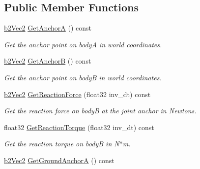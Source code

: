 \subsection*{Public Member Functions}
\begin{DoxyCompactItemize}
\item 
\hyperlink{structb2_vec2}{b2\+Vec2} \hyperlink{classb2_pulley_joint_a05ac0d0d927e9541f08b07cb1bf9ec56}{Get\+AnchorA} () const \hypertarget{classb2_pulley_joint_a05ac0d0d927e9541f08b07cb1bf9ec56}{}\label{classb2_pulley_joint_a05ac0d0d927e9541f08b07cb1bf9ec56}

\begin{DoxyCompactList}\small\item\em Get the anchor point on bodyA in world coordinates. \end{DoxyCompactList}\item 
\hyperlink{structb2_vec2}{b2\+Vec2} \hyperlink{classb2_pulley_joint_a5cc3596f683d621b9a885c2569ecd452}{Get\+AnchorB} () const \hypertarget{classb2_pulley_joint_a5cc3596f683d621b9a885c2569ecd452}{}\label{classb2_pulley_joint_a5cc3596f683d621b9a885c2569ecd452}

\begin{DoxyCompactList}\small\item\em Get the anchor point on bodyB in world coordinates. \end{DoxyCompactList}\item 
\hyperlink{structb2_vec2}{b2\+Vec2} \hyperlink{classb2_pulley_joint_a38c174bf1cf1011063ff4c16556b331e}{Get\+Reaction\+Force} (float32 inv\+\_\+dt) const \hypertarget{classb2_pulley_joint_a38c174bf1cf1011063ff4c16556b331e}{}\label{classb2_pulley_joint_a38c174bf1cf1011063ff4c16556b331e}

\begin{DoxyCompactList}\small\item\em Get the reaction force on bodyB at the joint anchor in Newtons. \end{DoxyCompactList}\item 
float32 \hyperlink{classb2_pulley_joint_a418b200055623474c44742b1342dd278}{Get\+Reaction\+Torque} (float32 inv\+\_\+dt) const \hypertarget{classb2_pulley_joint_a418b200055623474c44742b1342dd278}{}\label{classb2_pulley_joint_a418b200055623474c44742b1342dd278}

\begin{DoxyCompactList}\small\item\em Get the reaction torque on bodyB in N$\ast$m. \end{DoxyCompactList}\item 
\hyperlink{structb2_vec2}{b2\+Vec2} \hyperlink{classb2_pulley_joint_a19eefa28d2647882406ea9bfe2850a9e}{Get\+Ground\+AnchorA} () const \hypertarget{classb2_pulley_joint_a19eefa28d2647882406ea9bfe2850a9e}{}\label{classb2_pulley_joint_a19eefa28d2647882406ea9bfe2850a9e}


\end{DoxyCompactItemize}
